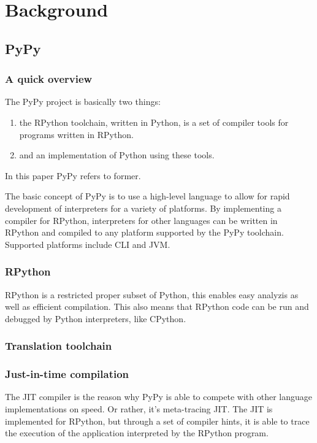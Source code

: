 
\section{Background}

\subsection{PyPy}

\subsubsection{A quick overview}

The PyPy project is basically two things:

\begin{enumerate}
\item the RPython toolchain, written in Python, is a set of compiler tools for 
programs written in RPython.
\item and an implementation of Python using these tools.
\end{enumerate}

In this paper PyPy refers to former.

The basic concept of PyPy is to use a high-level language to allow for rapid
development of interpreters for a variety of platforms. By implementing a compiler
for RPython, interpreters for other languages can be written in RPython and 
compiled to any platform supported by the PyPy toolchain. Supported platforms include
CLI and JVM. \cite{ancona2007rpython} 

\subsubsection{RPython}

RPython is a restricted proper subset of Python, this enables easy analyzis 
as well as efficient compilation. This also means that RPython code can be
run and debugged by Python interpreters, like CPython.

\subsubsection{Translation toolchain}


\subsubsection{Just-in-time compilation}

The JIT compiler is the reason why PyPy is able to compete with other language implementations
on speed. Or rather, it's meta-tracing JIT. The JIT is implemented
for RPython, but through a set of compiler hints, it is able to trace the 
execution of the application interpreted by the RPython program.

